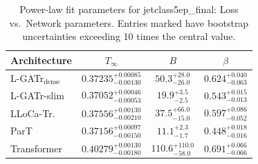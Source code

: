 \begin{table}[h]
  \centering
  \begin{tabular}{lccc}
    \toprule
    Architecture & $T_\infty$ & $B$ & $\beta$ \\
    \midrule
    L-GATr$_\mathrm{dense}$ & $0.37235^{+0.00085}_{-0.00130}$ & $50.3^{+28.0}_{-26.0}$ & $0.624^{+0.040}_{-0.063}$ \\
    L-GATr-slim & $0.37052^{+0.00046}_{-0.00053}$ & $19.9^{+3.5}_{-2.5}$ & $0.543^{+0.015}_{-0.013}$ \\
    LLoCa-Tr. & $0.37556^{+0.00130}_{-0.00210}$ & $37.5^{+66.0}_{-15.0}$ & $0.597^{+0.086}_{-0.052}$ \\
    ParT & $0.37156^{+0.00097}_{-0.00150}$ & $11.1^{+2.3}_{-1.7}$ & $0.448^{+0.018}_{-0.016}$ \\
    Transformer & $0.40279^{+0.00130}_{-0.00180}$ & $110.6^{+110.0}_{-58.0}$ & $0.691^{+0.066}_{-0.066}$ \\
    \bottomrule
  \end{tabular}
  \caption{Power-law fit parameters for jetclass5ep\_final: Loss vs.\ Network parameters. Entries marked \textemdash{} have bootstrap uncertainties exceeding 10 times the central value.}
  \label{tab:jetclass5ep_final}
\end{table}
